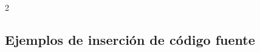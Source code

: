 	\lipsum[4]

	\begin{multicols}{2}

		\lipsum[4]


		\lipsum[2-3]

	\end{multicols}

\subsection{Ejemplos de inserción de código fuente}

	\newcommand{\insertsrcmanual}[2]{\href{https://latex.ppizarror.com/informe.html?srctype=#1\#hlp-srccode}{#2}}

